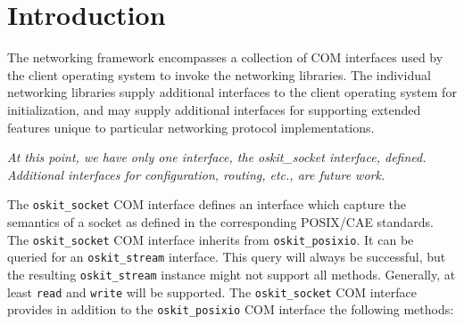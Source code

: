%
% 
%

\label{net}

\section{Introduction}

	The \oskit{} networking framework encompasses a collection of COM
	interfaces used by the client operating system to invoke the 
	networking libraries.
	The individual networking libraries supply additional interfaces to
	the client operating system for initialization, and may supply
	additional interfaces for supporting extended features unique to
	particular networking protocol implementations.


	\emph{At this point, we have only one interface, the oskit_socket 
	interface, defined. Additional interfaces for configuration, 
	routing, etc., are future work.}


	The \texttt{oskit_socket} COM interface defines an interface which
	capture the semantics of a socket as defined in the corresponding
	POSIX/CAE standards.
	The \texttt{oskit_socket} COM interface inherits from 
	\texttt{oskit_posixio}. It can be queried for an \texttt{oskit_stream} 
	interface. This query will always be successful, but the resulting
	\texttt{oskit_stream} instance might not support all methods.
	Generally, at least \texttt{read} and \texttt{write} will be supported.
	The \texttt{oskit_socket} COM interface provides in addition to 
	the \texttt{oskit_posixio} COM interface the following methods:

